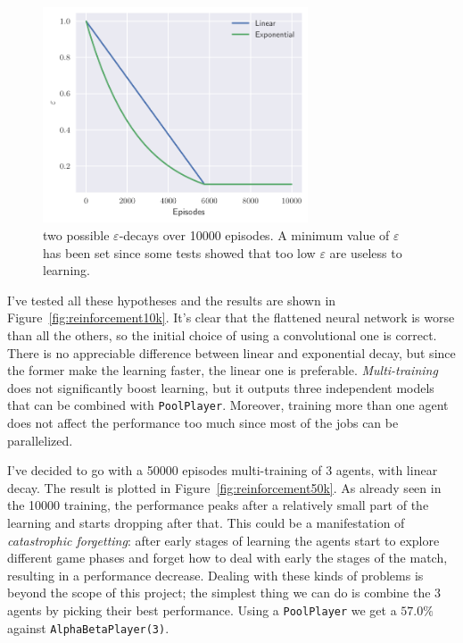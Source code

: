 \documentclass{article}
\newcommand{\ipy}[1]{\texttt{#1}}
\begin{document}
  \begin{figure}
    \centering
    \includegraphics[width=0.7\textwidth]{img/decay.pdf}
    
    \caption{two possible \(\varepsilon\)-decays over 10000 episodes. A minimum value of \(\varepsilon\) has been set since some tests showed that too low \(\varepsilon\) are useless to learning.}
    \label{fig:decays}
  \end{figure}

  I've tested all these hypotheses and the results are shown in Figure~\ref{fig:reinforcement10k}. It's clear that the flattened neural network is worse than all the others, so the initial choice of using a convolutional one is correct. There is no appreciable difference between linear and exponential decay, but since the former make the learning faster, the linear one is preferable.
  \emph{Multi-training} does not significantly boost learning, but it outputs three independent models that can be combined with \ipy{PoolPlayer}. Moreover, training more than one agent does not affect the performance too much since most of the jobs can be parallelized.
 
  I've decided to go with a 50000 episodes multi-training of 3 agents, with linear decay. The result is plotted in Figure~\ref{fig:reinforcement50k}. As already seen in the 10000 training, the performance peaks after a relatively small part of the learning and starts dropping after that. This could be a manifestation of \emph{catastrophic forgetting}\cite{kirkpatrick2017overcoming}: after early stages of learning the agents start to explore different game phases and forget how to deal with early the stages of the match, resulting in a performance decrease. Dealing with these kinds of problems is beyond the scope of this project; the simplest thing we can do is combine the 3 agents by picking their best performance. Using a \ipy{PoolPlayer} we get a \(57.0\si{\percent}\) against \ipy{AlphaBetaPlayer(3)}.
  
\end{document}

